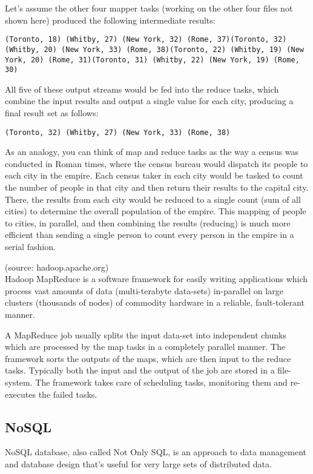 \documentclass[12pt]{article}
\begin{document}
Let’s assume the other four mapper tasks (working on the other four files not shown here) produced the following intermediate results:
\begin{verbatim}
(Toronto, 18) (Whitby, 27) (New York, 32) (Rome, 37)(Toronto, 32) (Whitby, 20) (New York, 33) (Rome, 38)(Toronto, 22) (Whitby, 19) (New York, 20) (Rome, 31)(Toronto, 31) (Whitby, 22) (New York, 19) (Rome, 30)
\end{verbatim}
All five of these output streams would be fed into the reduce tasks, which combine the input results and output a single value for each city, producing a final result set as follows:
\begin{verbatim}
(Toronto, 32) (Whitby, 27) (New York, 33) (Rome, 38)
\end{verbatim}
As an analogy, you can think of map and reduce tasks as the way a cen­sus was conducted in Roman times, where the census bureau would dis­patch its people to each city in the empire. Each census taker in each city would be tasked to count the number of people in that city and then return their results to the capital city. There, the results from each city would be reduced to a single count (sum of all cities) to determine the overall popula­tion of the empire. This mapping of people to cities, in parallel, and then com­bining the results (reducing) is much more efficient than sending a single per­son to count every person in the empire in a serial fashion.

\bigskip
(source: hadoop.apache.org)\\
Hadoop MapReduce is a software framework for easily writing applications which process vast amounts of data (multi-terabyte data-sets) in-parallel on large clusters (thousands of nodes) of commodity hardware in a reliable, fault-tolerant manner.

A MapReduce job usually splits the input data-set into independent chunks which are processed by the map tasks in a completely parallel manner. The framework sorts the outputs of the maps, which are then input to the reduce tasks. Typically both the input and the output of the job are stored in a file-system. The framework takes care of scheduling tasks, monitoring them and re-executes the failed tasks.

\subsection{NoSQL}

NoSQL database, also called Not Only SQL, is an approach to data management and database design that's useful for very large sets of distributed data.  
\end{document}
